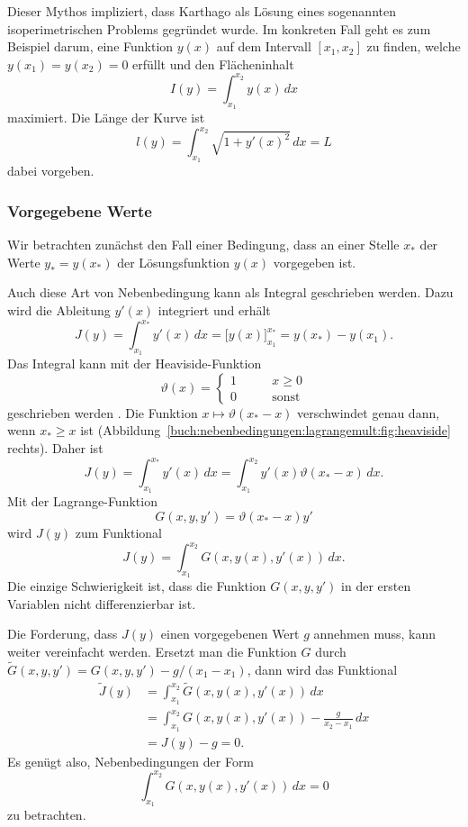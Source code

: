 Dieser Mythos impliziert, dass Karthago als Lösung eines sogenannten
isoperimetrischen Problems gegründet wurde.
%
Im konkreten Fall geht es zum Beispiel darum, eine Funktion $y(x)$
auf dem Intervall $[x_1,x_2]$ zu finden, welche $y(x_1)=y(x_2)=0$
erfüllt und den Flächeninhalt
\[
I(y)
=
\int_{x_1}^{x_2} y(x)\,dx
\]
maximiert.
Die Länge der Kurve ist
\[
l(y)
=
\int_{x_1}^{x_2}
\sqrt{1+y'(x)^2}
\,dx
=
L
\]
dabei vorgeben.

%
%
\subsubsection{Vorgegebene Werte}
Wir betrachten zunächst den Fall einer Bedingung, dass an einer Stelle
$x_*$ der Werte $y_*=y(x_*)$ der Lösungsfunktion $y(x)$ vorgegeben ist.

Auch diese Art von Nebenbedingung kann als Integral geschrieben werden.
Dazu wird die Ableitung $y'(x)$ integriert und erhält
\[
J(y)
=
\int_{x_1}^{x_*} y'(x)\,dx
=
\biggl[y(x)\biggr]_{x_1}^{x_*}
=
y(x_*)-y(x_1).
\]
Das Integral kann mit der Heaviside-Funktion
\begin{equation}
\vartheta(x)
=
\begin{cases}
1&\qquad x\ge 0\\
0&\qquad\text{sonst}
\end{cases}
\label{buch:nebenbedingungen:lagrangemult:eqn:heaviside}
\end{equation}
geschrieben werden%
.
Die Funktion $x\mapsto\vartheta(x_*-x)$ verschwindet genau dann,
wenn $x_*\ge x$ ist
(Abbildung~\ref{buch:nebenbedingungen:lagrangemult:fig:heaviside} rechts).
Daher ist
\[
J(y)
=
\int_{x_1}^{x_*} y'(x)\,dx
=
\int_{x_1}^{x_2} y'(x)\vartheta(x_*-x)\,dx.
\]
Mit der Lagrange-Funktion
\begin{equation}
G(x,y,y')
=
\vartheta(x_*-x)
y'
\label{buch:nebenbedingungen:lagrangemult:eqn:heavilagrange}
\end{equation}
wird $J(y)$ zum Funktional
\[
J(y)
=
\int_{x_1}^{x_2}
G(x,y(x),y'(x))
\,dx.
\]
Die einzige Schwierigkeit ist, dass die Funktion $G(x,y,y')$
in der ersten Variablen nicht differenzierbar ist.

Die Forderung, dass $J(y)$ einen vorgegebenen Wert $g$ annehmen muss,
kann weiter vereinfacht werden.
Ersetzt man die Funktion $G$ durch $\tilde{G}(x,y,y')=G(x,y,y')-g/(x_1-x_1)$,
dann wird das Funktional
\begin{align*}
\tilde{J}(y)
&=
\int_{x_1}^{x_2}
\tilde{G}(x,y(x),y'(x))\,dx
\\
&=
\int_{x_1}^{x_2} G(x,y(x),y'(x)) - \frac{g}{x_2-x_1}\,dx
\\
&=
J(y) - g
=
0.
\end{align*}
Es genügt also, Nebenbedingungen der Form
\[
\int_{x_1}^{x_2} G(x,y(x),y'(x))\,dx = 0
\]
zu betrachten.

